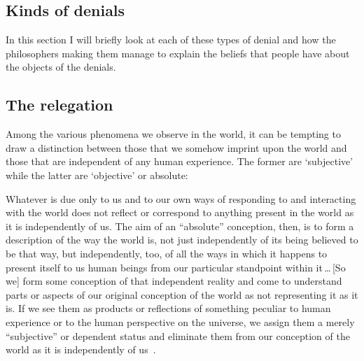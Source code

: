 \documentclass[11pt]{article}
\newenvironment{squote}{%
	\begin{spacing}{1}
	\begin{list}{}{%
	\setlength{\labelwidth}{0pt}%
	\rightmargin\leftmargin%
	}
	\item\relax
	}{%
	\end{list}%
	\end{spacing}
	}
\begin{document}
\begin{spacing}{1.5}
\section{Kinds of denials}
In this section I will briefly look at each of these types of denial and how the philosophers making them manage to explain the beliefs that people have about the objects of the denials.

\subsection{The relegation}
\label{relegate}
Among the various phenomena we observe in the world, it can be tempting to draw a distinction between those that we somehow imprint upon the world and those that are independent of any human experience. The former are `subjective' while the latter are `objective' or absolute:
\begin{squote}
Whatever is due only to us and to our own ways of responding to and interacting with the world does not reflect or correspond to anything present in the world as it is independently of us. The aim of an ``absolute'' conception, then, is to form a description of the way the world is, not just independently of its being believed to be that way, but independently, too, of all the ways in which it happens to present itself to us human beings from our particular standpoint within it\,\ldots\,[So we] form some conception of that independent reality and come to understand parts or aspects of our original conception of the world as not representing it as it is. If we see them as products or reflections of something peculiar to human experience or to the human perspective on the universe, we assign them a merely ``subjective'' or dependent status and eliminate them from our conception of the world as it is independently of us~\citep[30--31]{stroud2000a}.
\end{squote}


\end{spacing}
\end{document}

